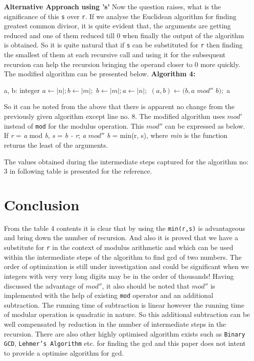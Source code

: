 \documentclass[12pt]{article}
\begin{document}
\begin{multicols}{2}
\textbf{Alternative Approach using 's'}
Now the question raises, what is the significance of this \texttt{s} over \texttt{r}.
If we analyse the Euclidean algorithm for finding greatest common divisor, it is quite evident that, the arguments are getting reduced and one of them reduced till 0 when finally the output of the algorithm is obtained. So it is quite natural that if \texttt{s} can be substituted  for \texttt{r} then finding the smallest of them at each recursive call and using it for the subsequent recursion can help the recursion bringing the operand closer to 0 more quickly. The modified algorithm can be presented below.
\newline \textbf{Algorithm 4:}
\begin{algorithmic}[1]
\STATE a, b: integer
	\STATE $a \gets |n|; b \gets |m|;$
\ELSE
	\STATE $b \gets |m|; a \gets |n|;$
\ENDIF
{} 
	\STATE $(a, b) \leftarrow (b, a  $ $mod'' $ $b);$
\ENDWHILE
\RETURN a
\end {algorithmic}

So it can be noted from the above that there is apparent no change from the previously given algorithm except line no. 8. The modified algorithm uses $mod'$ instead of \texttt{mod} for the modulus operation. This $mod''$ can be expressed as below.
If \textit{r} = \textit{a} mod \textit{b}, \textit{s} = \textit{b - r};
\textit{a} $mod''$ \textit{b} = min(r, s), where \textit{min} is the function returns the least of the arguments.

The values obtained during the intermediate steps captured for the algorithm no: 3 in following table is presented for the reference.

\section{Conclusion}
From the table 4 contents it is clear that by using the \texttt{min(r,s)} is advantageous and bring down the number of recursion. And also it is proved that we have a substitute for \texttt{r} in the context of modulus arithmetic and which can be used within the intermediate steps of the algorithm to find gcd of two numbers. The order of optimization is still under investigation and could be significant when we integers with very very long digits may be in the order of thousands! Having discussed the advantage of \texttt{$mod''$}, it also should be noted that \texttt{$mod''$} is implemented with the help of existing \texttt{mod} operator and an additional subtraction. The running time of subtraction is linear however the running time of modular operation is quadratic in nature. So this additional subtraction can be well compensated by reduction in the number of intermediate steps in the recursion. There are also other highly optimised algorithm exists such as \texttt{Binary GCD}, \texttt{Lehmer's Algorithm} etc. for finding the gcd and this paper does not intent to provide a optimise algorithm for gcd.


\end{multicols}
\end{document}
